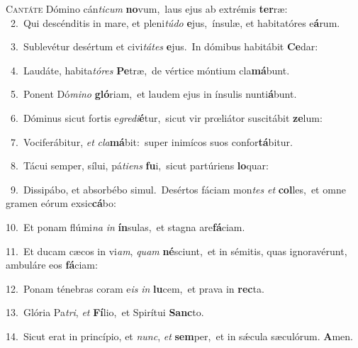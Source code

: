 \lettrine{\initial\textcolor{\initialcolor}{C}}{antáte} Dómino cán\-\textit{ti}\-\textit{cum} \textbf{no}\-vum,~\star laus ejus ab extrémis \textbf{ter}\-ræ:\\
{\numbfont\textcolor{\numbcolor}{~2.}}~Qui descénditis in mare, et pleni\-\textit{tú}\-\textit{do} \textbf{e}\-jus,~\star ínsulæ, et habitatóres e\-\textbf{á}\-rum.\par
{\numbfont\textcolor{\numbcolor}{~3.}}~Sublevétur desértum et civi\-\textit{tá}\-\textit{tes} \textbf{e}\-jus.~\star In dómibus habitábit \textbf{Ce}\-dar:\par
{\numbfont\textcolor{\numbcolor}{~4.}}~Laudáte, habita\-\textit{tó}\-\textit{res} \textbf{Pe}\-træ,~\star de vértice móntium cla\-\textbf{má}\-bunt.\par
{\numbfont\textcolor{\numbcolor}{~5.}}~Ponent Dó\-\textit{mi}\-\textit{no} \textbf{gló}\-riam,~\star et laudem ejus in ínsulis nunti\-\textbf{á}\-bunt.\par
{\numbfont\textcolor{\numbcolor}{~6.}}~Dóminus sicut fortis e\-\textit{gre}\-\textit{di}\textbf{é}tur,~\star sicut vir prœliátor suscitábit \textbf{ze}\-lum:\par
{\numbfont\textcolor{\numbcolor}{~7.}}~Vociferábitur, \textit{et} \textit{cla}\-\textbf{má}bit:~\star super inimícos suos confor\-\textbf{tá}\-bitur.\par
{\numbfont\textcolor{\numbcolor}{~8.}}~Tácui semper, sílui, pá\-\textit{ti}\-\textit{ens} \textbf{fu}\-i,~\star sicut partúriens \textbf{lo}\-quar:\par
{\numbfont\textcolor{\numbcolor}{~9.}}~Dissipábo, et absorbébo simul.~\dagger Desértos fáciam mon\textit{tes} \textit{et} \textbf{col}\-les,~\star et omne gramen eórum exsic\-\textbf{cá}\-bo:\par
{\numbfont\textcolor{\numbcolor}{10.}}~Et ponam flúmi\textit{na} \textit{in} \textbf{ín}\-sulas,~\star et stagna are\-\textbf{fá}\-ciam.\par
{\numbfont\textcolor{\numbcolor}{11.}}~Et ducam cæcos in vi\-\textit{am}\-, \textit{quam} \textbf{né}\-sciunt,~\star et in sémitis, quas ignoravérunt, ambuláre eos \textbf{fá}\-ciam:\par
{\numbfont\textcolor{\numbcolor}{12.}}~Ponam ténebras coram e\textit{is} \textit{in} \textbf{lu}\-cem,~\star et prava in \textbf{rec}\-ta.\par
{\numbfont\textcolor{\numbcolor}{13.}}~Glória Pa\-\textit{tri}\-, \textit{et} \textbf{Fí}\-lio,~\star et Spirítui \textbf{Sanc}\-to.\par
{\numbfont\textcolor{\numbcolor}{14.}}~Sicut erat in princípio, et \textit{nunc}\-, \textit{et} \textbf{sem}\-per,~\star et in sǽcula sæculórum. \textbf{A}\-men.\par
